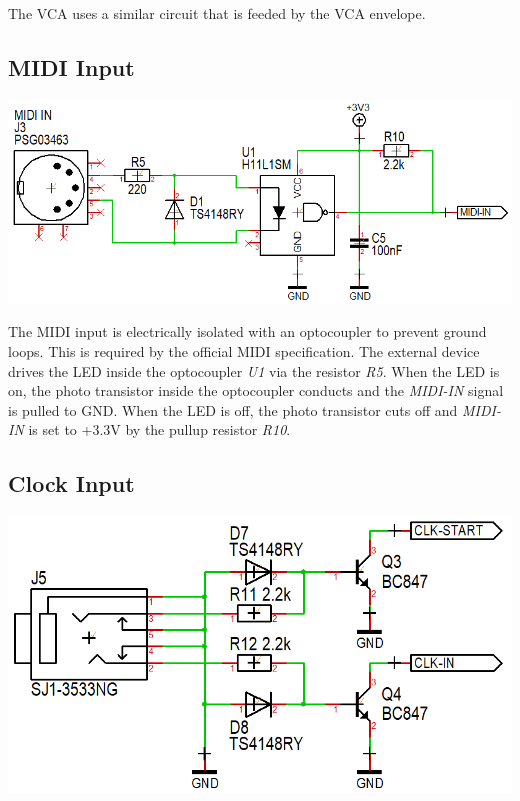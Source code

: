 \documentclass{scrartcl}
\begin{document}
The VCA uses a similar circuit that is feeded by the VCA envelope.

\subsection{MIDI Input}

\begin{center}
    \includegraphics[scale=0.50]{assets/schema-midi.png}
\end{center}

The MIDI input is electrically isolated with an optocoupler to prevent ground loops. This is required by the official MIDI specification. The external device drives the LED inside the optocoupler \emph{U1} via the resistor \emph{R5}. When the LED is on, the photo transistor inside the optocoupler conducts and the \emph{MIDI-IN} signal is pulled to GND. When the LED is off, the photo transistor cuts off and \emph{MIDI-IN} is set to +3.3V by the pullup resistor \emph{R10}.

\subsection{Clock Input}

\begin{center}
    \includegraphics[scale=0.35]{assets/schema-clocks.png}
\end{center}
\end{document}
